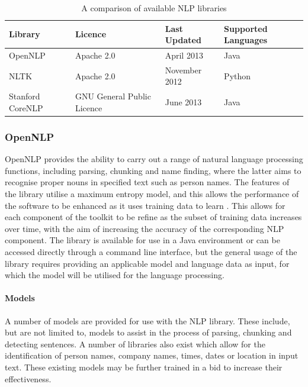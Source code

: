 \begin{table}[H]
	\centering
	\small
	\begin{tabular}{|p{3.3cm}|p{4.9cm}|p{3.0cm}|p{2.3cm}|}
	\hline
	\textbf{Library} & \textbf{Licence} & \textbf{Last Updated}  &
	\textbf{Supported Languages} \\ \hline
	OpenNLP & Apache 2.0 &  April 2013 & Java \\ \hline
	NLTK & Apache 2.0 & November 2012 & Python \\ \hline
	Stanford CoreNLP & GNU General Public Licence & June 2013 & Java \\	\hline
	\end{tabular}
	\caption {A comparison of available NLP libraries}
\end{table}

\subsubsection{OpenNLP}

OpenNLP provides the ability to carry out a range of natural language processing
functions, including parsing, chunking and name finding, where the latter aims
to recognise proper nouns in specified text such as person names. The features
of the library utilise a maximum entropy model, and this allows the performance
of the software to be enhanced as it uses training data to learn
\citep{apache13}. This allows for each component of the toolkit to be refine as the
subset of training data increases over time, with the aim of increasing the
accuracy of the corresponding NLP component. The library is available for use in
a Java environment or can be accessed directly through a command line interface,
but the general usage of the library requires providing an applicable model and
language data as input, for which the model will be utilised for the language
processing.

\paragraph{Models}

A number of models are provided for use with the NLP library. These include, but
are not limited to, models to assist in the process of parsing, chunking and
detecting sentences. A number of libraries also exist which allow for the
identification of person names, company names, times, dates or location in input
text. These existing models may be further trained in a bid to increase their
effectiveness.


